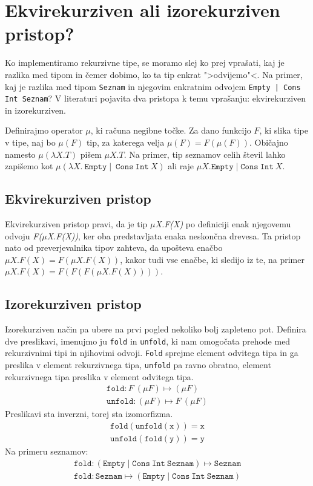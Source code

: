 \documentclass[12pt,a4paper,openany]{book}
\begin{document}
\section{Ekvirekurziven ali izorekurziven pristop?}
Ko implementiramo rekurzivne tipe, se moramo slej ko prej vprašati, kaj je razlika med tipom in čemer dobimo, ko ta tip enkrat ">odvijemo"<. Na primer, kaj je razlika med tipom \lstinline{Seznam}
in njegovim enkratnim odvojem \lstinline{Empty | Cons Int Seznam}? V literaturi pojavita dva pristopa k temu vprašanju: ekvirekurziven in izorekurziven.

Definirajmo operator $\mu$, ki računa negibne točke. Za dano funkcijo $F$, ki slika tipe v tipe, naj bo $\mu(F)$ tip, za katerega velja $\mu(F) = F(\mu(F))$. Običajno namesto $\mu (\lambda X . T)$ 
pišem $\mu X . T$. Na primer, tip seznamov celih števil lahko zapišemo kot $\mu (\lambda X . \ \mathtt{Empty} \mid \ \mathtt{Cons} \ \mathtt{Int} \ X)$ ali raje $\mu X . \mathtt{Empty} \mid \mathtt{Cons} \ \mathtt{Int} \ X$.

\subsection{Ekvirekurziven pristop}
Ekvirekurziven pristop pravi, da je tip \emph{\(\mu\)X.F(X)} po definiciji enak njegovemu odvoju \emph{F(\(\mu\)X.F(X))}, ker oba predstavljata enaka neskončna drevesa. Ta pristop nato od 
preverjevalnika tipov zahteva, da upošteva enačbo $\mu X . F(X) = F(\mu X . F(X))$, kakor tudi vse enačbe, ki sledijo iz te, na primer $\mu X. F(X) = F(F(F(\mu X . F(X))))$. 

\subsection{Izorekurziven pristop}
Izorekurziven način pa ubere na prvi pogled nekoliko bolj zapleteno pot. Definira dve preslikavi, imenujmo ju \lstinline{fold} in \lstinline{unfold}, ki nam omogočata prehode med rekurzivnimi tipi in njihovimi odvoji. 
\lstinline{Fold} sprejme element odvitega tipa in ga preslika v element rekurzivnega tipa, \lstinline{unfold} pa ravno obratno, element rekurzivnega tipa preslika v element odvitega tipa.
\begin{align*}
    \mathtt{fold} : F \ (\mu F) \mapsto (\mu F)\\
    \mathtt{unfold} : (\mu F) \mapsto F \ (\mu F)
\end{align*}
Preslikavi sta inverzni, torej sta izomorfizma.
\begin{align*}
  \mathtt{fold(unfold(x)) = x}\\
  \mathtt{unfold(fold(y)) = y}
\end{align*}
Na primeru seznamov:
\begin{align*}
  \mathtt{fold} : (\mathtt{Empty} \mid \mathtt{Cons} \ \mathtt{Int} \ \mathtt{Seznam}) \mapsto \mathtt{Seznam}\\
  \mathtt{fold} : \mathtt{Seznam} \mapsto (\mathtt{Empty} \mid \mathtt{Cons} \ \mathtt{Int} \ \mathtt{Seznam})
\end{align*}
\end{document}
